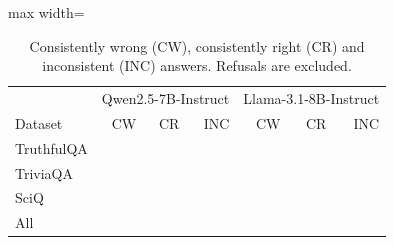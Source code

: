 \begin{table}[t]
\centering
\footnotesize
\caption{Consistently wrong (CW), consistently right (CR) and inconsistent (INC) answers. Refusals are excluded.}
\label{tab:counts}
\begin{adjustbox}{max width=\columnwidth}
\begin{tabular}{lrrrrrr}
\toprule
 & \multicolumn{3}{c}{Qwen2.5-7B-Instruct} & \multicolumn{3}{c}{Llama-3.1-8B-Instruct} \\
Dataset & CW & CR & INC & CW & CR & INC \\
\midrule
TruthfulQA & \TODO{} & \TODO{} & \TODO{} & \TODO{} & \TODO{} & \TODO{} \\
TriviaQA & \TODO{} & \TODO{} & \TODO{} & \TODO{} & \TODO{} & \TODO{} \\
SciQ & \TODO{} & \TODO{} & \TODO{} & \TODO{} & \TODO{} & \TODO{} \\
\midrule
All & \TODO{} & \TODO{} & \TODO{} & \TODO{} & \TODO{} & \TODO{} \\
\bottomrule
\end{tabular}
\end{adjustbox}
\end{table}
